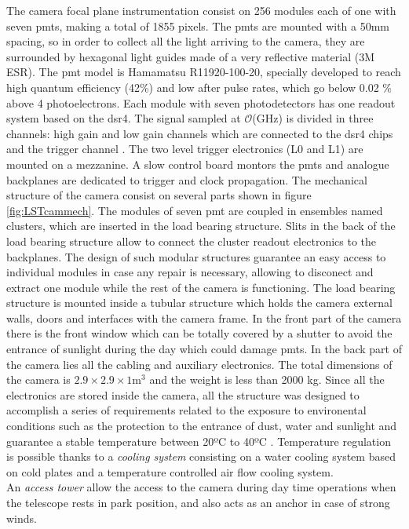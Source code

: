 \documentclass[main.tex]{subfiles}
\begin{document}
  The camera focal plane instrumentation consist on 256 modules each of one with seven \glspl{pmt}, making a total of 1855 pixels. The \glspl{pmt} are mounted with a 50mm spacing, so in order to collect all the light arriving to the camera, they are surrounded by hexagonal light guides made of a very reflective material (3M ESR). The \gls{pmt} model is Hamamatsu R11920-100-20, specially developed to reach high quantum efficiency (42\%) and low after pulse rates, which go below 0.02 \% above 4 photoelectrons. Each module with seven photodetectors has one readout system based on the \gls{dsr4}. The signal sampled at $\mathcal{O}$(GHz) is divided in three channels: high gain and low gain channels which are connected to the \gls{dsr4} chips and the trigger channel \cite{2017LST}. The two level trigger electronics (L0 and L1) are mounted on a mezzanine. A slow control board montors the \glspl{pmt} and analogue backplanes are dedicated to trigger and clock propagation.  
  The mechanical structure of the camera consist on several parts shown in figure \ref{fig:LSTcammech}. The modules of seven \gls{pmt} are coupled in ensembles named clusters, which are inserted in the load bearing structure. Slits in the back of the load bearing structure allow to connect the cluster readout electronics to the  backplanes. The design of such modular structures guarantee an easy access to individual modules in case any repair is necessary, allowing to disconect and extract one module while the rest of the camera is functioning.
  The load bearing structure is mounted inside a tubular structure which holds the camera external walls, doors and interfaces with the camera frame. In the front part of the camera there is the front window which can be totally covered by a shutter to avoid the entrance of sunlight during the day which could damage \glspl{pmt}. In the back part of the camera lies all the cabling and auxiliary electronics. The total dimensions of the camera is $2.9\times2.9\times 1$m$^3$ and the weight is less than 2000 kg. Since all the electronics are stored inside the camera, all the structure was designed to accomplish a series of requirements related to the exposure to environental conditions such as the protection to the entrance of dust, water and sunlight and guarantee a stable temperature between 20ºC to 40ºC \cite{2013LSTCamMech}. Temperature regulation is possible thanks to a \textit{cooling system} consisting on a water cooling system based on cold plates and a temperature controlled air flow cooling system.\\
 An \textit{access tower} allow the access to the camera during day time operations when the telescope rests in park position, and also acts as an anchor in case of strong winds. 
\end{document}
